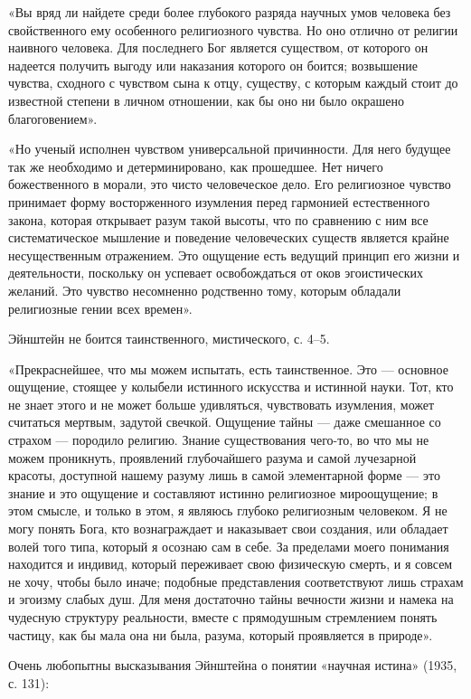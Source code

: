 «Вы вряд ли найдете среди более глубокого разряда научных умов человека без
свойственного ему особенного религиозного чувства. Но оно отлично от религии
наивного человека. Для последнего Бог является существом, от которого он
надеется получить выгоду или наказания которого он боится; возвышение чувства,
сходного с чувством сына к отцу, существу, с которым каждый стоит до известной
степени в личном отношении, как бы оно ни было окрашено благоговением».

«Но ученый исполнен чувством универсальной причинности. Для него будущее так же
необходимо и детерминировано, как прошедшее. Нет ничего божественного в морали,
это чисто человеческое дело. Его религиозное чувство принимает форму
восторженного изумления перед гармонией естественного закона, которая открывает
разум такой высоты, что по сравнению с ним все систематическое мышление и
поведение человеческих существ является крайне несущественным отражением. Это
ощущение есть ведущий принцип его жизни и деятельности, поскольку он успевает
освобождаться от оков эгоистических желаний. Это чувство несомненно родственно
тому, которым обладали религиозные гении всех времен».

Эйнштейн не боится таинственного, мистического, с. 4--5.

«Прекраснейшее, что мы можем испытать, есть таинственное. Это --- основное
ощущение, стоящее у колыбели истинного искусства и истинной науки. Тот, кто не
знает этого и не может больше удивляться, чувствовать изумления, может
считаться мертвым, задутой свечкой. Ощущение тайны --- даже смешанное со страхом
--- породило религию. Знание существования чего-то, во что мы не можем
проникнуть, проявлений глубочайшего разума и самой лучезарной красоты,
доступной нашему разуму лишь в самой элементарной форме --- это знание и это
ощущение и составляют истинно религиозное мироощущение; в этом смысле, и только
в этом, я являюсь глубоко религиозным человеком. Я не могу понять Бога, кто
вознаграждает и наказывает свои создания, или обладает волей того типа, который
я осознаю сам в себе. За пределами моего понимания находится и индивид, который
переживает свою физическую смерть, и я совсем не хочу, чтобы было иначе;
подобные представления соответствуют лишь страхам и эгоизму слабых душ. Для
меня достаточно тайны вечности жизни и намека на чудесную структуру реальности,
вместе с прямодушным стремлением понять частицу, как бы мала она ни была,
разума, который проявляется в природе».

Очень любопытны высказывания Эйнштейна о понятии «научная истина» (1935, с.
131):

